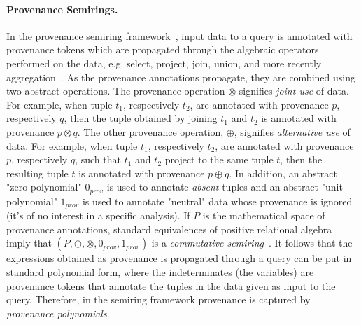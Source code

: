 \documentclass[11pt]{article}
\begin{document}
\paragraph*{Provenance Semirings.}
In the provenance semiring framework~\cite{GreenKT07}, input data to a query is annotated with
provenance tokens which are propagated through the algebraic operators performed on the data, e.g. select, project, join, union, and more recently aggregation~\cite{amsterdamer2011provenance}.
As the provenance annotations propagate, they are combined using two abstract operations.
The provenance operation $\otimes$ signifies {\em joint use} of data. For example, when tuple $t_1$,
respectively $t_2$, are annotated with provenance $p$, respectively $q$, then the tuple obtained by
joining $t_1$ and $t_2$ is annotated with provenance $p\otimes q$. The other provenance operation, $\oplus$, signifies {\em alternative use} of data. For example, when tuple $t_1$, respectively $t_2$, are annotated with provenance $p$, respectively $q$, such that $t_1$ and $t_2$ project to the same
tuple $t$, then the resulting tuple $t$ is annotated with provenance $p\oplus q$. In addition,
an abstract "zero-polynomial" $0_{prov}$ is used to annotate \emph{absent} tuples and an abstract "unit-polynomial" $1_{prov}$ is used to annotate 
"neutral" data whose provenance is ignored (it's of no interest in a specific analysis). If $P$ is the mathematical space of provenance annotations, standard equivalences of positive relational algebra
imply that $(P,\oplus,\otimes,0_{prov},1_{prov})$ is a \emph{commutative semiring}~\cite{GreenKT07}. It follows that
the expressions obtained as provenance is propagated through a query can be put in standard polynomial form, where the indeterminates (the variables) are provenance tokens that annotate the tuples in the data given as input to the query. Therefore, in the semiring framework provenance is captured by \emph{provenance polynomials}.



\end{document}

